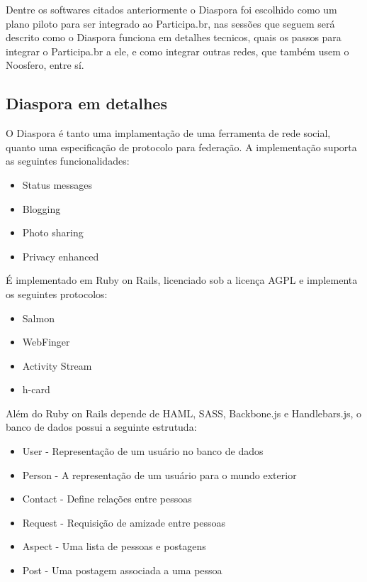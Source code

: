 \documentclass[12pt]{article}
\begin{document}
Dentre os softwares citados anteriormente o Diaspora foi escolhido como um
plano piloto para ser integrado ao Participa.br, nas sessões que seguem será
descrito como o Diaspora funciona em detalhes tecnicos, quais os passos para
integrar o Participa.br a ele, e como integrar outras redes, que também usem
o Noosfero, entre sí.

\subsection{Diaspora em detalhes}


O Diaspora é tanto uma implamentação de uma ferramenta de rede social, quanto
uma especificação de protocolo para federação. A implementação suporta as
seguintes funcionalidades:

\begin{itemize}
  \item Status messages
  \item Blogging
  \item Photo sharing
  \item Privacy enhanced
\end{itemize}

É implementado em Ruby on Rails, licenciado sob a licença AGPL e implementa os
seguintes protocolos:

\begin{itemize}
  \item Salmon
  \item WebFinger
  \item Activity Stream
  \item h-card
\end{itemize}

Além do Ruby on Rails depende de HAML, SASS, Backbone.js e Handlebars.js, o
banco de dados possui a seguinte estrutuda:

\begin{itemize}
  \item User - Representação de um usuário no banco de dados
  \item Person - A representação de um usuário para o mundo exterior
  \item Contact - Define relações entre pessoas
  \item Request - Requisição de amizade entre pessoas
  \item Aspect - Uma lista de pessoas e postagens
  \item Post - Uma postagem associada a uma pessoa
\end{itemize}
\end{document}
